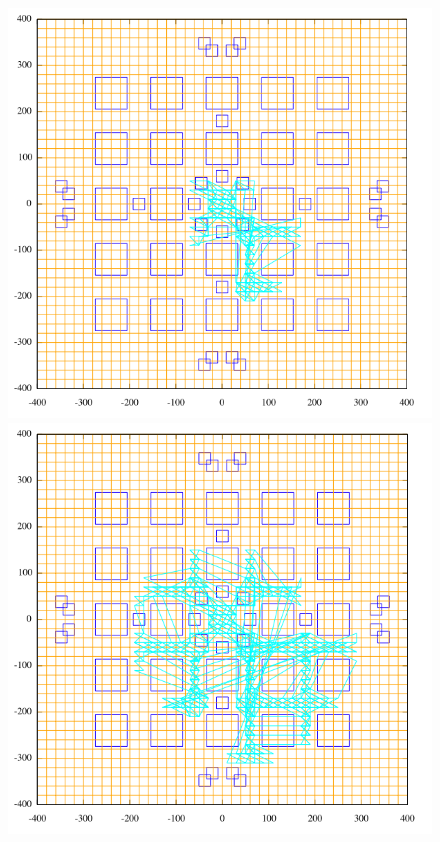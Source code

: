 \begin{figure}\label{fig:bf}
\begin{minipage}[b]{0.3\linewidth} %
\centering
\includegraphics[width=0.9\linewidth]{bf1.png}
\end{minipage}
\hspace{0.5cm} %
\begin{minipage}[b]{0.3\linewidth}
\centering
\includegraphics[width=0.9\linewidth]{bf2.png}

\end{minipage}
\end{figure}
